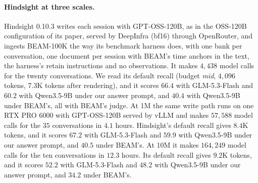 \documentclass{article}
\begin{document}
\paragraph{Hindsight at three scales.} Hindsight 0.10.3 writes each session with GPT-OSS-120B, as in the OSS-120B configuration of its paper, served by DeepInfra (bf16) through OpenRouter, and ingests BEAM-100K the way its benchmark harness does, with one bank per conversation, one document per session with BEAM's time anchors in the text, the harness's retain instructions and no observations. It makes $4{,}438$ model calls for the twenty conversations. We read its default recall (budget \emph{mid}, $4{,}096$ tokens, $7.3$K tokens after rendering), and it scores $66.4$ with GLM-5.3-Flash and $60.2$ with Qwen3.5-9B under our answer prompt, and $40.4$ with Qwen3.5-9B under BEAM's, all with BEAM's judge. At 1M the same write path runs on one RTX PRO 6000 with GPT-OSS-120B served by vLLM and makes $57{,}588$ model calls for the $35$ conversations in $4.1$ hours. Hindsight's default recall gives $8.4$K tokens, and it scores $67.2$ with GLM-5.3-Flash and $59.9$ with Qwen3.5-9B under our answer prompt, and $40.5$ under BEAM's. At 10M it makes $164{,}249$ model calls for the ten conversations in $12.3$ hours. Its default recall gives $9.2$K tokens, and it scores $52.2$ with GLM-5.3-Flash and $48.2$ with Qwen3.5-9B under our answer prompt, and $34.2$ under BEAM's.
\end{document}
